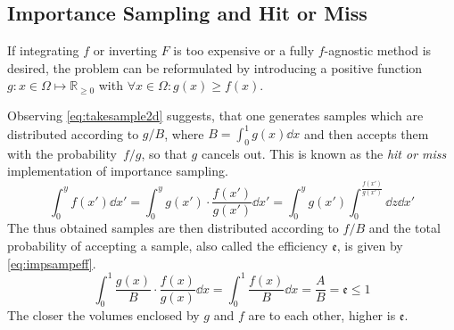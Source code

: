 \subsection{Importance Sampling and Hit or Miss}%
\label{sec:hitmiss}
If integrating \(f\) or inverting \(F\) is too expensive or a fully
\(f\)-agnostic method is desired, the problem can be reformulated by
introducing a positive function
\(g\colon x\in\Omega\mapsto\mathbb{R}_{\geq 0}\) with
\(\forall x\in\Omega\colon g(x)\geq f(x)\).

Observing \cref{eq:takesample2d} suggests, that one generates samples
which are distributed according to \(g/B\), where
\(B=\int_0^1g(x)\dd{x}\) and then accepts them with the
probability~\(f/g\), so that \(g\) cancels out. This is known as the
\emph{hit or miss} implementation of importance sampling.
%
\begin{equation}
  \label{eq:takesample2d}
  \int_{0}^{y}f(x')\dd{x'} =
  \int_{0}^{y}g(x')\cdot\frac{f(x')}{g(x')}\dd{x'}
  = \int_{0}^{y}g(x')\int_{0}^{\frac{f(x')}{g(x')}}\dd{z}\dd{x'}
\end{equation}
%
The thus obtained samples are then distributed according to \(f/B\)
and the total probability of accepting a sample, also called the
efficiency \(\mathfrak{e}\), is given by \cref{eq:impsampeff}.
%
\begin{equation}
  \label{eq:impsampeff}
  \int_0^1\frac{g(x)}{B}\cdot\frac{f(x)}{g(x)}\dd{x} = \int_0^1\frac{f(x)}{B}\dd{x} = \frac{A}{B} = \mathfrak{e}\leq 1
\end{equation}
%
The closer the volumes enclosed by \(g\) and \(f\) are to each other,
higher is \(\mathfrak{e}\).

